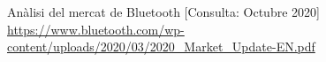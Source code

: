 \begin{thebibliography}{2}
Anàlisi del mercat de Bluetooth
[Consulta: Octubre 2020] \newline
\href{https://www.bluetooth.com/wp-content/uploads/2020/03/2020\_Market\_Update-EN.pdf}{https://www.bluetooth.com/wp-content/uploads/2020/03/2020\_Market\_Update-EN.pdf}

\end{thebibliography}